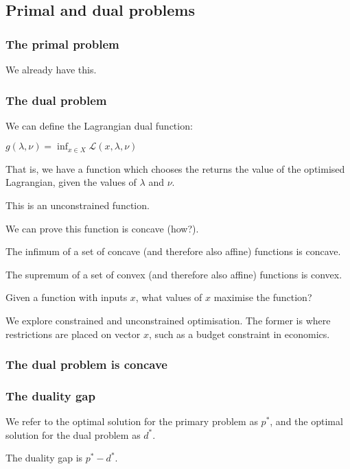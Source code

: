 
\subsection{Primal and dual problems}

\subsubsection{The primal problem}

We already have this.

\subsubsection{The dual problem}

We can define the Lagrangian dual function:

\(g(\lambda, \nu ) = \inf_{x\in X} \mathcal{L}(x, \lambda ,\nu )\)

That is, we have a function which chooses the returns the value of the optimised Lagrangian, given the values of \(\lambda \) and \(\nu\).

This is an unconstrained function.

We can prove this function is concave (how?).

The infimum of a set of concave (and therefore also affine) functions is concave.

The supremum of a set of convex (and therefore also affine) functions is convex.

Given a function with inputs \(x\), what values of \(x\) maximise the function?

We explore constrained and unconstrained optimisation. The former is where restrictions are placed on vector \(x\), such as a budget constraint in economics.

\subsubsection{The dual problem is concave}

\subsubsection{The duality gap}

We refer to the optimal solution for the primary problem as \(p^*\), and the optimal solution for the dual problem as \(d^*\).

The duality gap is \(p^*-d^*\).

